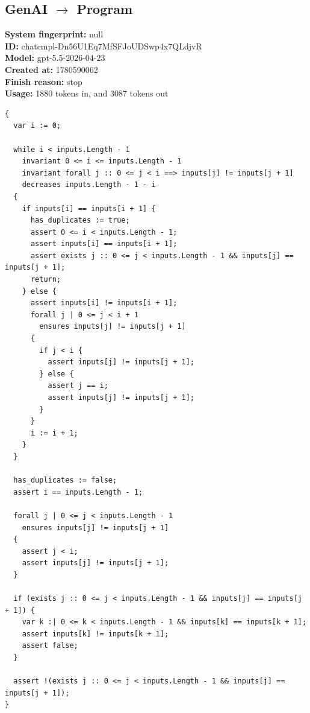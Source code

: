 \documentclass{article}
\begin{document}
\subsection*{GenAI $\rightarrow$ Program}
\textbf{System fingerprint: }null
\\\textbf{ID: }chatcmpl-Dn56U1Eq7MfSFJoUDSwp4x7QLdjvR
\\\textbf{Model: }gpt-5.5-2026-04-23
\\\textbf{Created at: }1780590062
\\\textbf{Finish reason: }stop
\\\textbf{Usage: }1880 tokens in, and 3087 tokens out
\begin{lstlisting}
{
  var i := 0;

  while i < inputs.Length - 1
    invariant 0 <= i <= inputs.Length - 1
    invariant forall j :: 0 <= j < i ==> inputs[j] != inputs[j + 1]
    decreases inputs.Length - 1 - i
  {
    if inputs[i] == inputs[i + 1] {
      has_duplicates := true;
      assert 0 <= i < inputs.Length - 1;
      assert inputs[i] == inputs[i + 1];
      assert exists j :: 0 <= j < inputs.Length - 1 && inputs[j] == inputs[j + 1];
      return;
    } else {
      assert inputs[i] != inputs[i + 1];
      forall j | 0 <= j < i + 1
        ensures inputs[j] != inputs[j + 1]
      {
        if j < i {
          assert inputs[j] != inputs[j + 1];
        } else {
          assert j == i;
          assert inputs[j] != inputs[j + 1];
        }
      }
      i := i + 1;
    }
  }

  has_duplicates := false;
  assert i == inputs.Length - 1;

  forall j | 0 <= j < inputs.Length - 1
    ensures inputs[j] != inputs[j + 1]
  {
    assert j < i;
    assert inputs[j] != inputs[j + 1];
  }

  if (exists j :: 0 <= j < inputs.Length - 1 && inputs[j] == inputs[j + 1]) {
    var k :| 0 <= k < inputs.Length - 1 && inputs[k] == inputs[k + 1];
    assert inputs[k] != inputs[k + 1];
    assert false;
  }

  assert !(exists j :: 0 <= j < inputs.Length - 1 && inputs[j] == inputs[j + 1]);
}
\end{lstlisting}
\end{document}
